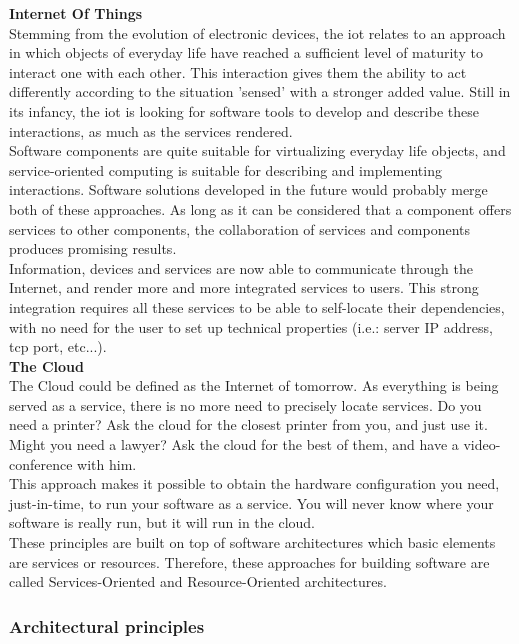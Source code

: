 {\bf Internet Of Things}\\
\label{subsec:iot}
Stemming from the evolution of electronic devices, the \gls{iot} relates to an approach in which objects of everyday life have reached a sufficient level of maturity to interact one with each other. This interaction gives them the ability to act differently according to the situation 'sensed' with a stronger added value. Still in its infancy, the \gls{iot} is looking for software tools to develop and describe these interactions, as much as the services rendered.\\
Software components are quite suitable for virtualizing everyday life objects, and service-oriented computing is suitable for describing and implementing interactions. Software solutions developed in the future would probably merge both of these approaches. As long as it can be considered that a component offers services to other components, the collaboration of services and components produces promising results.\\

Information, devices and services are now able to communicate through the Internet, and render more and more integrated services to users. This strong integration requires all these services to be able to self-locate their dependencies, with no need for the user to set up technical properties (i.e.: server IP address, tcp port, etc...).\\

{\bf The Cloud}\\
\label{subsec:cloud}
The Cloud could be defined as the Internet of tomorrow. As everything is being served as a service, there is no more need to precisely locate services. Do you need a printer? Ask the cloud for the closest printer from you, and just use it. Might you need a lawyer? Ask the cloud for the best of them, and have a video-conference with him.\\
This approach makes it possible to obtain the hardware configuration you need, just-in-time, to run your software as a service. You will never know where your software is really run, but it will run in the cloud.\\

These principles are built on top of software architectures which basic elements are services or resources. Therefore, these approaches for building software are called Services-Oriented and Resource-Oriented architectures.

\subsubsection{Architectural principles}

